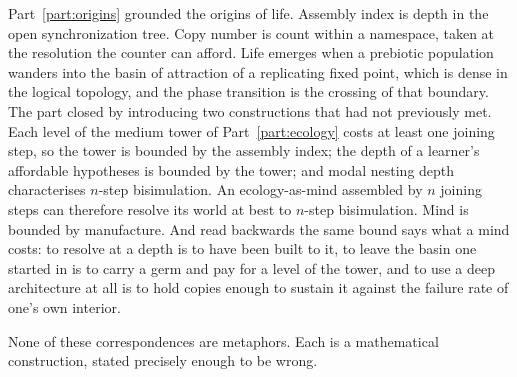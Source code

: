 Part~\ref{part:origins} grounded the origins of life.
Assembly index is depth in the open synchronization tree.
Copy number is count within a namespace, taken at the resolution the
counter can afford.
Life emerges when a prebiotic population wanders into the basin of
attraction of a replicating fixed point, which is dense in the logical
topology, and the phase transition is the crossing of that boundary.
The part closed by introducing two constructions that had not previously
met.
Each level of the medium tower of Part~\ref{part:ecology} costs at least
one joining step, so the tower is bounded by the assembly index; the
depth of a learner's affordable hypotheses is bounded by the tower; and
modal nesting depth characterises $n$-step bisimulation.
An ecology-as-mind assembled by $n$ joining steps can therefore resolve
its world at best to $n$-step bisimulation.
Mind is bounded by manufacture.
And read backwards the same bound says what a mind costs: to resolve at a
depth is to have been built to it, to leave the basin one started in is to
carry a germ and pay for a level of the tower, and to use a deep
architecture at all is to hold copies enough to sustain it against the
failure rate of one's own interior.

None of these correspondences are metaphors.
Each is a mathematical construction, stated precisely enough to be wrong.
